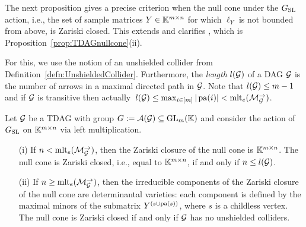 The next proposition gives a precise criterion when the null cone under the $G_{\operatorname{SL}}$ action, i.e., the set of sample matrices $Y \in \mathbb K^{m \times n}$ for which $\ell_Y$ is not bounded from above, is Zariski closed. This extends and clarifies \cite[Corollary~5.7]{SiagaPaper}, which is Proposition~\ref{prop:TDAGnullcone}(ii).

For this, we use the notion of an unshielded collider from Definition~\ref{defn:UnshieldedCollider}. Furthermore, the \emph{length} %
 $l(\mathcal{G})$ of a DAG $\mathcal{G}$ is the number of arrows in a maximal directed path in $\mathcal{G}$. Note that $l(\mathcal{G}) \leq m-1$ and if $\mathcal{G}$ is transitive then actually $\, l(\mathcal{G}) \leq \max_{i \in [m]} |\operatorname{pa}(i)| < \operatorname{mlt}_e(\mathcal{M}_{\mathcal{G}}^{\to})$.

\begin{prop}\label{prop:TDAGnullcone}
	Let $\mathcal{G}$ be a TDAG with group $G := \mathcal{A}(\mathcal{G}) \subseteq \operatorname{GL}_m(\mathbb K)$ and consider the action of $G_{\operatorname{SL}}$ on $\mathbb K^{m \times n}$ via left multiplication.
		\begin{itemize}
			\item[(i)] If $n < \operatorname{mlt}_e(\mathcal{M}_{\mathcal{G}}^{\to})$, then the Zariski closure of the null cone is $\mathbb K^{m \times n}$. The null cone is Zariski closed, i.e., equal to $\mathbb K^{m \times n}$, if and only if $n \leq l(\mathcal{G})$.
						
			\item[(ii)] If $n \geq \operatorname{mlt}_e(\mathcal{M}_{\mathcal{G}}^{\to})$, then the irreducible components of the Zariski closure of the null cone are determinantal varieties:
			each component is defined by the maximal minors of the submatrix $Y^{(s \cup \operatorname{pa}(s))}$, where $s$ is a childless vertex.
			The null cone is Zariski closed if and only if $\mathcal{G}$ has no unshielded colliders.
		\end{itemize}
\end{prop}

